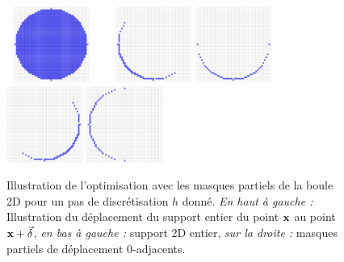 \begin{figure}[th]
  \centerline{\includegraphics[width=0.1cm,keepaspectratio=false]{images/misc/TransparentPixel}
  \includegraphics[width=2.5cm]{images/digitalSnow/testIntegralInvariantCurvatureEstimator-PartialMask4}
  \includegraphics[width=0.17cm,keepaspectratio=false]{images/misc/TransparentPixel}
  \includegraphics[width=0.3cm,keepaspectratio=false]{images/misc/TransparentPixel}
  \includegraphics[width=2.5cm]{images/digitalSnow/testIntegralInvariantCurvatureEstimator-PartialMask8}
  \includegraphics[width=2.5cm]{images/digitalSnow/testIntegralInvariantCurvatureEstimator-PartialMask7}
  \includegraphics[width=2.5cm]{images/digitalSnow/testIntegralInvariantCurvatureEstimator-PartialMask6}
  \includegraphics[width=2.5cm]{images/digitalSnow/testIntegralInvariantCurvatureEstimator-PartialMask5}}
  \caption{Illustration de l'optimisation avec les masques partiels de la boule
  2D pour un pas de discrétisation $h$ donné. \textit{En haut à gauche :}
  Illustration du déplacement du support entier du point $\mathbf{x}$ au point
  $\mathbf{x}+\vec{\delta}$, \textit{en bas à gauche :} support 2D entier, \emph{sur la
  droite :} masques partiels de déplacement 0-adjacents.
  \label{fig:MovingKernel2D}}
\end{figure}

